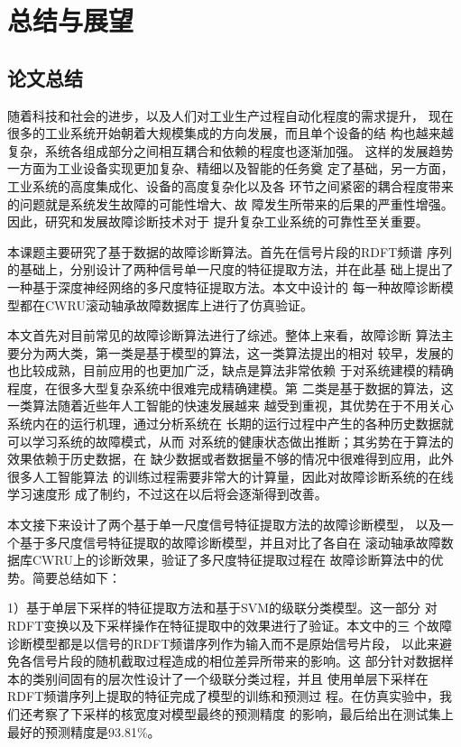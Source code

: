 \chapter{总结与展望}

\section{论文总结}

随着科技和社会的进步，以及人们对工业生产过程自动化程度的需求提升，
现在很多的工业系统开始朝着大规模集成的方向发展，而且单个设备的结
构也越来越复杂，系统各组成部分之间相互耦合和依赖的程度也逐渐加强。
这样的发展趋势一方面为工业设备实现更加复杂、精细以及智能的任务奠
定了基础，另一方面，工业系统的高度集成化、设备的高度复杂化以及各
环节之间紧密的耦合程度带来的问题就是系统发生故障的可能性增大、故
障发生所带来的后果的严重性增强。因此，研究和发展故障诊断技术对于
提升复杂工业系统的可靠性至关重要。

本课题主要研究了基于数据的故障诊断算法。首先在信号片段的RDFT频谱
序列的基础上，分别设计了两种信号单一尺度的特征提取方法，并在此基
础上提出了一种基于深度神经网络的多尺度特征提取方法。本文中设计的
每一种故障诊断模型都在CWRU滚动轴承故障数据库上进行了仿真验证。

本文首先对目前常见的故障诊断算法进行了综述。整体上来看，故障诊断
算法主要分为两大类，第一类是基于模型的算法，这一类算法提出的相对
较早，发展的也比较成熟，目前应用的也更加广泛，缺点是算法非常依赖
于对系统建模的精确程度，在很多大型复杂系统中很难完成精确建模。第
二类是基于数据的算法，这一类算法随着近些年人工智能的快速发展越来
越受到重视，其优势在于不用关心系统内在的运行机理，通过分析系统在
长期的运行过程中产生的各种历史数据就可以学习系统的故障模式，从而
对系统的健康状态做出推断；其劣势在于算法的效果依赖于历史数据，在
缺少数据或者数据量不够的情况中很难得到应用，此外很多人工智能算法
的训练过程需要非常大的计算量，因此对故障诊断系统的在线学习速度形
成了制约，不过这在以后将会逐渐得到改善。

本文接下来设计了两个基于单一尺度信号特征提取方法的故障诊断模型，
以及一个基于多尺度信号特征提取的故障诊断模型，并且对比了各自在
滚动轴承故障数据库CWRU上的诊断效果，验证了多尺度特征提取过程在
故障诊断算法中的优势。简要总结如下：

1）基于单层下采样的特征提取方法和基于SVM的级联分类模型。这一部分
对RDFT变换以及下采样操作在特征提取中的效果进行了验证。本文中的三
个故障诊断模型都是以信号的RDFT频谱序列作为输入而不是原始信号片段，
以此来避免各信号片段的随机截取过程造成的相位差异所带来的影响。这
部分针对数据样本的类别间固有的层次性设计了一个级联分类过程，并且
使用单层下采样在RDFT频谱序列上提取的特征完成了模型的训练和预测过
程。在仿真实验中，我们还考察了下采样的核宽度对模型最终的预测精度
的影响，最后给出在测试集上最好的预测精度是93.81\%。

